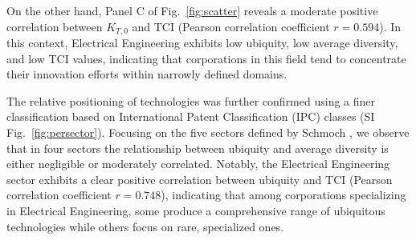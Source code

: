 \documentclass[fleqn,10pt]{wlscirep}
\begin{document}
On the other hand, Panel C of Fig.~\ref{fig:scatter} reveals a moderate positive correlation between $K_{T,0}$ and TCI (Pearson correlation coefficient $r=0.594$). 
In this context, Electrical Engineering exhibits low ubiquity, low average diversity, and low TCI values, indicating that corporations in this field tend to concentrate their innovation efforts within narrowly defined domains.

The relative positioning of technologies was further confirmed using a finer classification based on International Patent Classification (IPC) classes (SI Fig.~\ref{fig:persector}). Focusing on the five sectors defined by Schmoch \cite{Schmoch2008}, we observe that in four sectors the relationship between ubiquity and average diversity is either negligible or moderately correlated. Notably, the Electrical Engineering sector exhibits a clear positive correlation between ubiquity and TCI (Pearson correlation coefficient $r=0.748$), indicating that among corporations specializing in Electrical Engineering, some produce a comprehensive range of ubiquitous technologies while others focus on rare, specialized ones.
\end{document}
